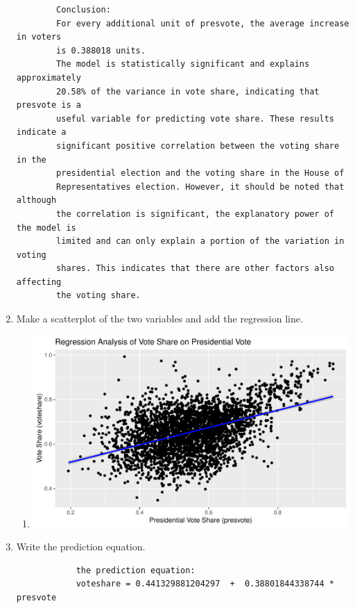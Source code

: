 \documentclass[12pt,letterpaper]{article}
\begin{document}
\begin{enumerate}
\begin{verbatim}
		Conclusion:
		For every additional unit of presvote, the average increase in voters 
		is 0.388018 units.
		The model is statistically significant and explains approximately 
		20.58% of the variance in vote share, indicating that presvote is a 
		useful variable for predicting vote share. These results indicate a 
		significant positive correlation between the voting share in the 
		presidential election and the voting share in the House of 
		Representatives election. However, it should be noted that although 
		the correlation is significant, the explanatory power of the model is 
		limited and can only explain a portion of the variation in voting 
		shares. This indicates that there are other factors also affecting 
		the voting share.
		\end{verbatim}
		\vspace{0cm}
		\item Make a scatterplot of the two variables and add the regression line. 
		
		\begin{enumerate}
			\item[]
			\includegraphics[width=.65\textwidth]{my_answers_question3.2_plot.pdf}
		\end{enumerate}
		\vspace{5cm}
		\item Write the prediction equation.
		
		\begin{verbatim}
			the prediction equation:
			voteshare = 0.441329881204297  +  0.38801844338744 * presvote
		\end{verbatim}
	\end{enumerate}
	

\newpage	
\end{document}
